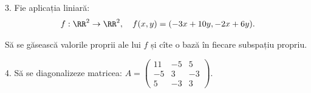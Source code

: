 3. Fie aplicația liniară:
\[
  f : \RR^2 \to \RR^2, \quad f(x, y) = (-3x + 10y, -2x + 6y).
\]

Să se găsească valorile proprii ale lui $ f $ și cîte o bază în fiecare
subspațiu propriu.

\vspace{0.5cm}

4. Să se diagonalizeze matricea:
$ A = \begin{pmatrix}
  11 & -5 & 5 \\
  -5 & 3 & -3 \\
  5 & -3 & 3
\end{pmatrix} $.



